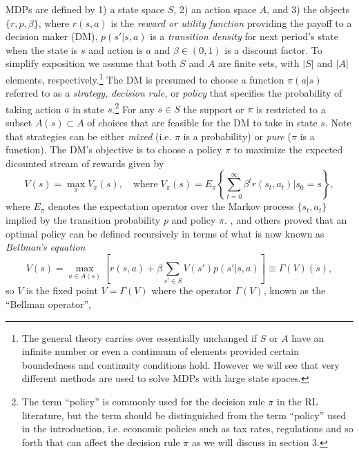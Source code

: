 MDPs are defined by  1) a state space $S$, 2) an action space $A$, and  3) the objects  $\{r,p,\beta\}$, where $r(s,a)$ is the {\it reward or utility function\/}
providing the payoff to a decision maker (DM), $p(s'|s,a)$ is a {\it transition density\/} for next period's state when the state is $s$ and action is $a$
and $\beta \in (0,1)$ is a discount factor.  To simplify exposition we assume
that both $S$ and $A$ are finite sets, with $|S|$ and $|A|$ elements, respectively.\footnote{\footnotesize The general
theory carries over essentially unchanged
if $S$ or $A$ have an infinite number or
even a continuum of elements provided certain boundedness and continuity conditions
hold. However we will see that very different methods are used to solve 
MDPs with large state spaces.} The DM is presumed to choose a function $\pi(a|s)$ referred to as a {\it strategy,\/} {\it decision rule,\/}
or {\it policy\/} that specifies the probability 
of taking action $a$ in state $s$.\footnote{\footnotesize The term ``policy'' is commonly used for the
decision rule $\pi$ in the RL literature, but the term should be distinguished
from the term ``policy'' used in the introduction, i.e. economic policies such as
tax rates, regulations and so forth that can affect the decision rule
$\pi$ as we will discuss in section 3.} For any $s \in S$ the support or $\pi$ is restricted to a subset $A(s) \subset A$ 
of choices that are feasible for the DM to take in state $s$. Note
that strategies can be either {\it mixed\/} (i.e. $\pi$ is a probability) or {\it pure\/} ($\pi$ is a function). The DM's objective is to choose a  policy
$\pi$ to maximize the expected dicounted stream of rewards given by
\begin{equation}
       V(s)= \max_\pi  V_\pi(s),  \quad \mbox{where} \;  V_\pi(s) = E_\pi \left\{\sum_{t=0}^\infty \beta^t r(s_t,a_t)| s_0=s\right\},
\label{eq:vdef}
\end{equation}
where $E_\pi$ denotes the expectation operator over the Markov process $\{s_t,a_t\}$ implied by the transition probability $p$ and policy $\pi$.
\citet{Bellman:1957}, \citet{Howard:1960} and others proved that an optimal policy can be defined recursively in terms
of what is now known as {\it Bellman's equation\/}
\begin{equation}
            V(s) = \max_{a \in A(s)}\left[ r(s,a)+ \beta \sum_{s' \in S} V(s')p(s'|s,a)\right] \equiv \Gamma(V)(s),
\label{eq:bellman}
\end{equation}
so $V$ is the fixed point $V=\Gamma(V)$ where the operator $\Gamma(V)$, known as the ``Bellman operator'',
